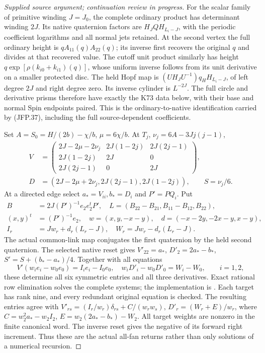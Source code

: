 \begin{proof}[Supplied source argument; continuation review in progress]
For the scalar family of primitive winding \(J=J_0\), the
complete ordinary product has determinant winding \(2J\).
Its native quaternion factors are \(H_J QH_{L_i-J}\), with
the periodic coefficient logarithms and all normal jets retained.
At the second vertex the full ordinary height is
\(qA_{11}(q)A_{22}(q)\); its inverse first recovers the original
\(q\) and divides at that recovered value. The cutoff unit
product similarly has height \(q\exp[\rho(k_{i0}+k_{i1})(q)]\),
whose uniform inverse follows from its unit derivative on a
smaller protected disc. The held Hopf map is
\((UH_JU^{-1})q_HH_{L_i-J}\), of left degree \(2J\) and
right degree zero. Its inverse cylinder is \(L^{-2J}\).
The full circle and derivative prisms therefore have exactly
the K73 data below, with their base and normal Spin endpoints
paired. This is the ordinary-to-native identification carried
by (JFP.37), including the full source-dependent coefficients.

Set \(A=S_0=H/(2b)-\chi/b\), \(\mu=6\chi/b\).
At \(T_j\), \(\nu_j=6A-3Jj(j-1)\),
\[
\begin{split}
 V&=\begin{pmatrix}
 2J-2\mu-2\nu_j&2J(1-2j)&2J(2j-1)\\
 2J(1-2j)&2J&0\\2J(2j-1)&0&2J
 \end{pmatrix},\\
 D&=(2J-2\mu+2\nu_j,2J(2j-1),2J(1-2j)),
 \qquad S=\nu_j/6.
\end{split}
\tag{JFP.41}
\]
At a directed edge select \(a_*=V_{ii},b_*=D_i\) and
\(P'=PQ_i\). Put
\[
\begin{split}
 B&=2J(P')^{-1}e_2e_2^tP',\quad
 L=(B_{22}-B_{21},B_{11}-B_{12},B_{22}),\\
 (x,y)^t&=(P')^{-1}e_2,\quad
 w=(x,y,-x-y),\quad d=(-x-2y,-2x-y,x-y),\\
 I_r&=Jw_r+d_r(L_r-J),\quad W_r=Jw_r-d_r(L_r-J).
\end{split}
\tag{JFP.42}
\]
The actual common-link map conjugates the first quaternion by
the held second quaternion. The selected native reset gives
\(V'_{22}=a_*\), \(D'_2=2a_*-b_*\),
\(S'=S+(b_*-a_*)/4\). Together with all equations
\[
 V'(w_ie_i-w_0e_0)=I_ie_i-I_0e_0,\quad
 w_iD'_i-w_0D'_0=W_i-W_0,\qquad i=1,2,
\tag{JFP.43}
\]
these determine all six symmetric entries and all three
derivatives. Exact rational row elimination solves the complete systems; the implementation is . Each target has rank nine,
and every redundant original equation is checked. The resulting
entries agree with
\(V'_{rs}=(I_r/w_r)\delta_{rs}+C/(w_rw_s)\),
\(D'_r=(W_r+E)/w_r\), where
\(C=w_2^2a_*-w_2I_2\), \(E=w_2(2a_*-b_*)-W_2\).
All target weights are nonzero in the finite canonical word.
The inverse reset gives the negative of its forward right
increment. Thus these are the actual all-fan returns rather
than only solutions of a numerical recursion.


\end{proof}
